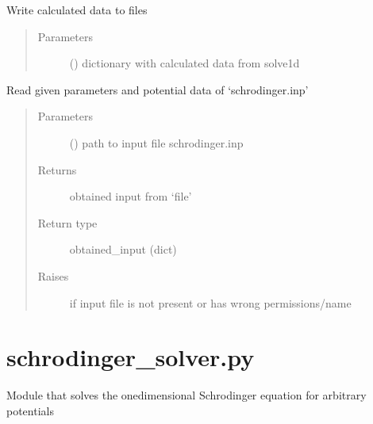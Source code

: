 \documentclass[letterpaper,10pt,english]{sphinxmanual}
\begin{document}
\begin{fulllineitems}
\label{\detokenize{index:schrodinger_io.output}}
Write calculated data to files
\begin{quote}\begin{description}
\item[{Parameters}] \leavevmode
{} () \textendash{} dictionary with calculated data from solve1d

\end{description}\end{quote}

\end{fulllineitems}


\begin{fulllineitems}
\label{\detokenize{index:schrodinger_io.read_input}}
Read given parameters and potential data of ‘schrodinger.inp’
\begin{quote}\begin{description}
\item[{Parameters}] \leavevmode
{} () \textendash{} path to input file schrodinger.inp

\item[{Returns}] \leavevmode
obtained input from ‘file’

\item[{Return type}] \leavevmode
obtained\_input (dict)

\item[{Raises}] \leavevmode
{} \textendash{} if input file is not present or has wrong permissions/name

\end{description}\end{quote}

\end{fulllineitems}



\section{schrodinger\_solver.py}
\label{\detokenize{index:module-schrodinger_solver}}\label{\detokenize{index:schrodinger-solver-py}}
Module that solves the onedimensional Schrodinger equation for arbitrary potentials
\end{document}

